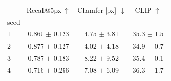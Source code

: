 \begin{tabular}{lccc}
\toprule
 & Recall@5px $\uparrow$ & Chamfer [px] $\downarrow$ & CLIP $\uparrow$ \\
seed &  &  &  \\
\midrule
1 & 0.860 $\pm$ 0.123 & 4.75 $\pm$ 3.81 & 35.3 $\pm$ 1.5 \\
2 & 0.877 $\pm$ 0.127 & 4.02 $\pm$ 4.18 & 34.9 $\pm$ 0.7 \\
3 & 0.787 $\pm$ 0.183 & 8.22 $\pm$ 9.52 & 35.4 $\pm$ 0.1 \\
4 & 0.716 $\pm$ 0.266 & 7.08 $\pm$ 6.09 & 36.3 $\pm$ 1.7 \\
\bottomrule
\end{tabular}
